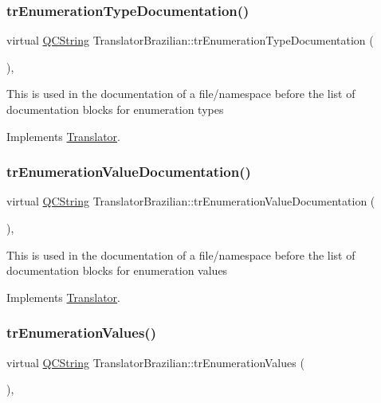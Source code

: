 \subsubsection{\texorpdfstring{trEnumerationTypeDocumentation()}{trEnumerationTypeDocumentation()}}
{\footnotesize\ttfamily virtual \mbox{\hyperlink{class_q_c_string}{Q\+C\+String}} Translator\+Brazilian\+::tr\+Enumeration\+Type\+Documentation (\begin{DoxyParamCaption}{ }\end{DoxyParamCaption})\hspace{0.3cm}{\ttfamily [inline]}, {\ttfamily [virtual]}}

This is used in the documentation of a file/namespace before the list of documentation blocks for enumeration types 

Implements \mbox{\hyperlink{class_translator}{Translator}}.

\mbox{\label{class_translator_brazilian_a4bbaea75b14a5e9868d99d2eec4681f4}} 
\subsubsection{\texorpdfstring{trEnumerationValueDocumentation()}{trEnumerationValueDocumentation()}}
{\footnotesize\ttfamily virtual \mbox{\hyperlink{class_q_c_string}{Q\+C\+String}} Translator\+Brazilian\+::tr\+Enumeration\+Value\+Documentation (\begin{DoxyParamCaption}{ }\end{DoxyParamCaption})\hspace{0.3cm}{\ttfamily [inline]}, {\ttfamily [virtual]}}

This is used in the documentation of a file/namespace before the list of documentation blocks for enumeration values 

Implements \mbox{\hyperlink{class_translator}{Translator}}.

\mbox{\label{class_translator_brazilian_a1b2d63ae3b5d59a4c6ee99bf5559aafa}} 
\subsubsection{\texorpdfstring{trEnumerationValues()}{trEnumerationValues()}}
{\footnotesize\ttfamily virtual \mbox{\hyperlink{class_q_c_string}{Q\+C\+String}} Translator\+Brazilian\+::tr\+Enumeration\+Values (\begin{DoxyParamCaption}{ }\end{DoxyParamCaption})\hspace{0.3cm}{\ttfamily [inline]}, {\ttfamily [virtual]}}

